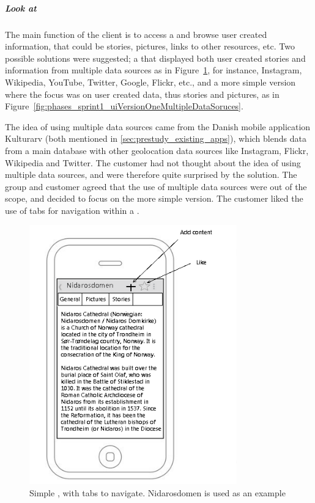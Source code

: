 \documentclass[11pt]{book}
\begin{document}
\subparagraph{Look at \wallentityp}
The main function of the client is to access a \wallentitys and browse user created information, that could be stories, pictures, links to other resources, etc. Two possible solutions were suggested; a \wallentitys that displayed both user created stories and information from multiple data sources as in Figure~\ref{fig:phases_sprint1_uiVersionOneSimpleWall}, for instance, Instagram, Wikipedia, YouTube, Twitter, Google, Flickr, etc., and a more simple version where the focus was on user created data, thus stories and pictures, as in Figure~\ref{fig:phases_sprint1_uiVersionOneMultipleDataSoruces}. 

The idea of using multiple data sources came from the Danish mobile application Kulturarv (both mentioned in \ref{sec:prestudy_existing_apps}), which blends data from a main database with other geolocation data sources like Instagram, Flickr, Wikipedia and Twitter. The customer had not thought about the idea of using multiple data sources, and were therefore quite surprised by the solution. The group and customer agreed that the use of multiple data sources were out of the scope, and decided to focus on the more simple version. The customer liked the use of tabs for navigation within a \wallentitys.

\begin{figure}[H]
    \centering
    \includegraphics[width=0.8\textwidth]{Figures/Phases/Sprint1/versiononeSimpleWall.png}
    \caption{Simple \wallentitys, with tabs to navigate. Nidarosdomen is used as an example}
    \label{fig:phases_sprint1_uiVersionOneSimpleWall}
\end{figure}
\end{document}
